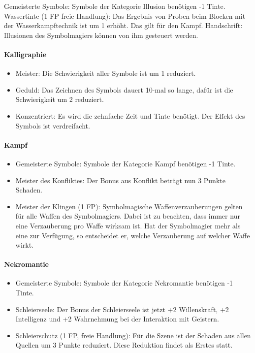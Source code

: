 \documentclass{article}
\begin{document}
Gemeisterte Symbole: Symbole der Kategorie Illusion benötigen -1 Tinte.
Wassertinte (1 FP freie Handlung): Das Ergebnis von Proben beim Blocken mit der Wasserkampftechnik ist um 1 erhöht.
Das gilt für den Kampf.
Handschrift: Illusionen des Symbolmagiers können von ihm gesteuert werden.

\paragraph{Kalligraphie}

\begin{itemize}
\item Meister: Die Schwierigkeit aller Symbole ist um 1 reduziert.
\item Geduld: Das Zeichnen des Symbols dauert 10-mal so lange, dafür ist die Schwierigkeit um 2 reduziert.
\item Konzentriert: Es wird die zehnfache Zeit und Tinte benötigt. Der Effekt des Symbols ist verdreifacht.
\end{itemize}

\paragraph{Kampf}

\begin{itemize}
\item Gemeisterte Symbole: Symbole der Kategorie Kampf benötigen -1 Tinte.
\item Meister des Konfliktes: Der Bonus aus Konflikt beträgt nun 3 Punkte Schaden.
\item Meister der Klingen (1 FP): Symbolmagische Waffenverzauberungen gelten für alle Waffen des Symbolmagiers. Dabei ist zu beachten, dass immer nur eine Verzauberung pro Waffe wirksam ist. Hat der Symbolmagier mehr als eine zur Verfügung, so entscheidet er, welche Verzauberung auf welcher Waffe wirkt.
\end{itemize}

\paragraph{Nekromantie}

\begin{itemize}
\item Gemeisterte Symbole: Symbole der Kategorie Nekromantie benötigen -1 Tinte.
\item Schleierseele: Der Bonus der Schleierseele ist jetzt +2 Willenskraft, +2 Intelligenz und +2 Wahrnehmung bei der Interaktion mit Geistern.
\item Schleierschutz (1 FP, freie Handlung): Für die Szene ist der Schaden aus allen Quellen um 3 Punkte reduziert. Diese Reduktion findet als Erstes statt.
\end{itemize}
\end{document}
